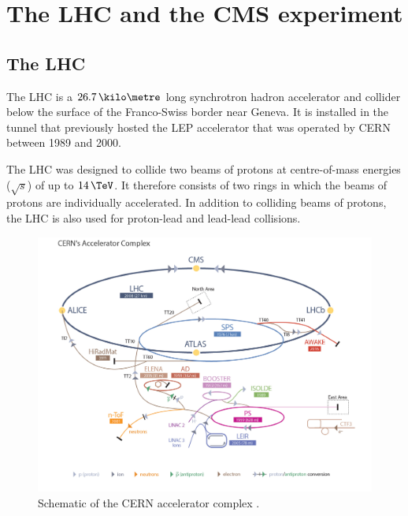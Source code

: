 \chapter{The \acs{LHC} and the \acs{CMS} experiment}
\label{chap:CMSLHC}

\section{The \acs{LHC}}
\label{sec:CMSLHC_LHC}

The \acf{LHC} \cite{lhc-machine}  is a $26.7\,\kilo\metre$ long synchrotron hadron accelerator and collider below the surface of the 
Franco-Swiss border near Geneva. It
is installed in the tunnel that previously hosted the \acf{LEP} accelerator \cite{lep-design}
that was operated by \acf{CERN} between 1989 and 2000.

The \ac{LHC} was designed to collide two beams of protons %
at centre-of-mass
energies ($\sqrt{s}$) of up to $14\,\TeV$. It therefore consists of two rings in which the beams
of protons are individually accelerated. In addition to colliding beams of protons, the \ac{LHC}
is also used for proton-lead and lead-lead collisions.
\begin{figure}[h!]
\includegraphics[width=\textwidth]{./Detector/Plots/LHC_default.jpg}
\caption[Schematic of the CERN accelerator complex.]{Schematic of the \ac{CERN} accelerator complex \cite{lhc-schematic}.}
\label{fig:lhc_schematic}
\end{figure}


